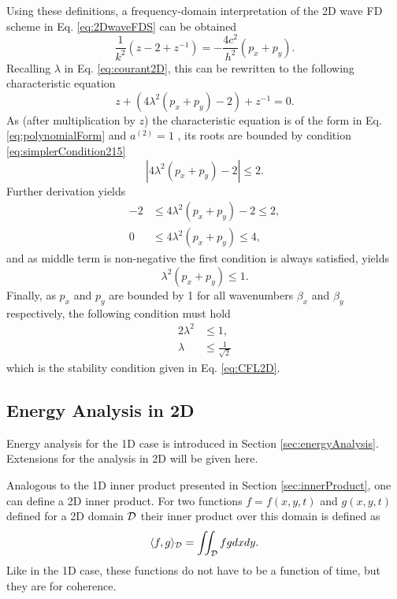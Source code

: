 Using these definitions, a frequency-domain interpretation of the 2D wave FD scheme in Eq. \eqref{eq:2DwaveFDS} can be obtained
\begin{equation*}
    \frac{1}{k^2}\left(z - 2 +z^{-1}\right) = -\frac{4c^2}{h^2} (p_x + p_y).
\end{equation*}
Recalling $\lambda$ in Eq. \eqref{eq:courant2D}, this can be rewritten to the following characteristic equation
\begin{equation}
    z + \left(4\lambda^2(p_x + p_y)-2\right) +z^{-1} = 0.
\end{equation}
As (after multiplication by $z$) the characteristic equation is of the form in Eq. \eqref{eq:polynomialForm} and $a^{(2)} = 1$ , its roots are bounded by condition \eqref{eq:simplerCondition215} 
\begin{equation*}
    \left|4\lambda^2(p_x + p_y)-2\right| \leq 2.
\end{equation*}
Further derivation yields
\begin{align*}
    -2 &\leq 4\lambda^2(p_x + p_y)-2 \leq 2, \\
    0 &\leq 4\lambda^2(p_x + p_y) \leq 4,
\end{align*} 
and as middle term is non-negative the first condition is always satisfied, yields
\begin{equation*}
    \lambda^2(p_x + p_y) \leq 1.
\end{equation*}
Finally, as $p_x$ and $p_y$ are bounded by 1 for all wavenumbers $\beta_x$ and $\beta_y$ respectively, the following condition must hold
\begin{align}
    2\lambda^2&\leq 1,\nonumber\\
    \lambda &\leq \frac{1}{\sqrt{2}}
\end{align}
which is the stability condition given in Eq. \eqref{eq:CFL2D}.

\subsection{Energy Analysis in 2D}\label{sec:energyAnalysis2DWave}
\def\domXred{\underline{d_x}}
\def\domYred{\underline{d_y}}
\def\domXredBoth{\underline{\overline{d_x}}}
\def\domYredBoth{\underline{\overline{d_y}}}
\def\domRedBoth{\underline{\overline{d}}}

Energy analysis for the 1D case is introduced in Section \ref{sec:energyAnalysis}. Extensions for the analysis in 2D will be given here.

Analogous to the 1D inner product presented in Section \ref{sec:innerProduct}, one can define a 2D inner product. For two functions $f = f(x,y,t)$ and $g(x,y,t)$ defined for a 2D domain $\mathcal{D}$ their inner product over this domain is defined as
\begin{equation}
    \langle f, g \rangle_{\mathcal{D}}  = \iint_{\mathcal{D}} f g dx dy.
\end{equation}
Like in the 1D case, these functions do not have to be a function of time, but they are for coherence. 

